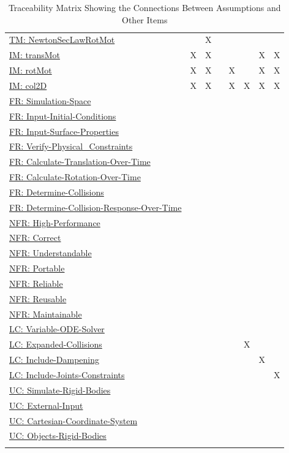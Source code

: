 \documentclass[12pt]{article}
\begin{document}
\begin{longtable}{l l l l l l l l}
\\
\hyperref[TM:NewtonSecLawRotMot]{TM: NewtonSecLawRotMot} &  & X &  &  &  &  & 
\\
\hyperref[IM:transMot]{IM: transMot} & X & X &  &  &  & X & X
\\
\hyperref[IM:rotMot]{IM: rotMot} & X & X &  & X &  & X & X
\\
\hyperref[IM:col2D]{IM: col2D} & X & X &  & X & X & X & X
\\
\hyperref[simSpace]{FR: Simulation-Space} &  &  &  &  &  &  & 
\\
\hyperref[inputInitialConds]{FR: Input-Initial-Conditions} &  &  &  &  &  &  & 
\\
\hyperref[inputSurfaceProps]{FR: Input-Surface-Properties} &  &  &  &  &  &  & 
\\
\hyperref[verifyPhysCons]{FR: Verify-Physical\_Constraints} &  &  &  &  &  &  & 
\\
\hyperref[calcTransOverTime]{FR: Calculate-Translation-Over-Time} &  &  &  &  &  &  & 
\\
\hyperref[calcRotOverTime]{FR: Calculate-Rotation-Over-Time} &  &  &  &  &  &  & 
\\
\hyperref[deterColls]{FR: Determine-Collisions} &  &  &  &  &  &  & 
\\
\hyperref[deterCollRespOverTime]{FR: Determine-Collision-Response-Over-Time} &  &  &  &  &  &  & 
\\
\hyperref[highPerformance]{NFR: High-Performance} &  &  &  &  &  &  & 
\\
\hyperref[correct]{NFR: Correct} &  &  &  &  &  &  & 
\\
\hyperref[understandable]{NFR: Understandable} &  &  &  &  &  &  & 
\\
\hyperref[portable]{NFR: Portable} &  &  &  &  &  &  & 
\\
\hyperref[reliable]{NFR: Reliable} &  &  &  &  &  &  & 
\\
\hyperref[reusable]{NFR: Reusable} &  &  &  &  &  &  & 
\\
\hyperref[maintainable]{NFR: Maintainable} &  &  &  &  &  &  & 
\\
\hyperref[lcVODES]{LC: Variable-ODE-Solver} &  &  &  &  &  &  & 
\\
\hyperref[lcEC]{LC: Expanded-Collisions} &  &  &  &  & X &  & 
\\
\hyperref[lcID]{LC: Include-Dampening} &  &  &  &  &  & X & 
\\
\hyperref[lcIJC]{LC: Include-Joints-Constraints} &  &  &  &  &  &  & X
\\
\hyperref[ucSRB]{UC: Simulate-Rigid-Bodies} &  &  &  &  &  &  & 
\\
\hyperref[ucEI]{UC: External-Input} &  &  &  &  &  &  & 
\\
\hyperref[ucCCS]{UC: Cartesian-Coordinate-System} &  &  &  &  &  &  & 
\\
\hyperref[ucORB]{UC: Objects-Rigid-Bodies} &  &  &  &  &  &  & 
\\
\bottomrule
\caption{Traceability Matrix Showing the Connections Between Assumptions and Other Items}
\label{Table:TraceMatAvsAll}
\end{longtable}
\end{document}
